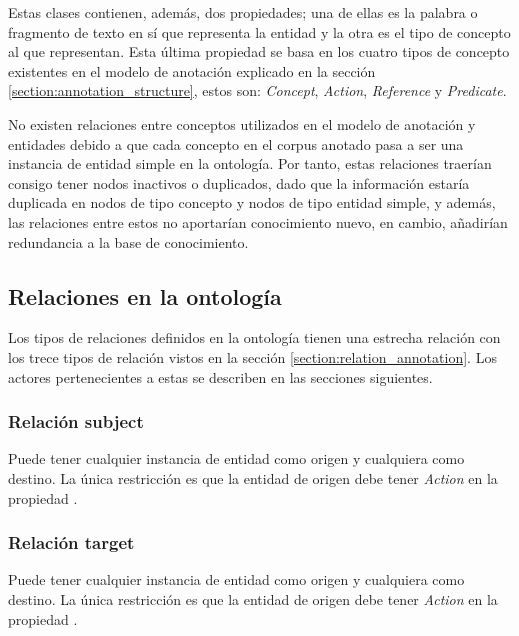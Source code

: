 \vspace{-0.1in}
Estas clases contienen, además, dos propiedades; una de ellas es la palabra o fragmento de texto en sí que representa la entidad y la otra es el tipo de concepto al que representan. Esta última propiedad se basa en los cuatro tipos de concepto existentes en el modelo de anotación explicado en la sección \ref{section:annotation_structure}, estos son: \textit{Concept}, \textit{Action}, \textit{Reference} y \textit{Predicate}.

No existen relaciones entre conceptos utilizados en el modelo de anotación y entidades debido a que cada concepto en el corpus anotado pasa a ser una instancia de entidad simple en la ontología. Por tanto, estas relaciones traerían consigo tener nodos inactivos o duplicados, dado que la información estaría duplicada en nodos de tipo concepto y nodos de tipo entidad simple, y además, las relaciones entre estos no aportarían conocimiento nuevo, en cambio, añadirían redundancia a la base de conocimiento.

\vspace{-0.2in}
\subsection{Relaciones en la ontología}
Los tipos de relaciones definidos en la ontología tienen una estrecha relación con los trece tipos de relación vistos en la sección \ref{section:relation_annotation}. Los actores pertenecientes a estas se describen en las secciones siguientes.

\vspace{-0.1in}
\subsubsection{Relación subject}
\vspace{-0.1in}
Puede tener cualquier instancia de entidad como origen y cualquiera como destino. La única restricción es que la entidad de origen debe tener \textit{Action} en la propiedad .

\vspace{-0.1in}
\subsubsection{Relación target}
\vspace{-0.1in}
Puede tener cualquier instancia de entidad como origen y cualquiera como destino. La única restricción es que la entidad de origen debe tener \textit{Action} en la propiedad .

